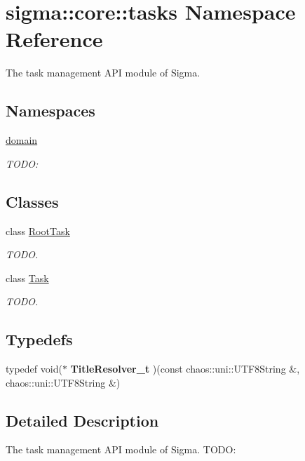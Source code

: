 \hypertarget{namespacesigma_1_1core_1_1tasks}{\section{sigma\-:\-:core\-:\-:tasks Namespace Reference}
\label{namespacesigma_1_1core_1_1tasks}
}


The task management A\-P\-I module of Sigma.  


\subsection*{Namespaces}
\begin{DoxyCompactItemize}
\item 
\hyperlink{namespacesigma_1_1core_1_1tasks_1_1domain}{domain}
\begin{DoxyCompactList}\small\item\em T\-O\-D\-O\-: \end{DoxyCompactList}\end{DoxyCompactItemize}
\subsection*{Classes}
\begin{DoxyCompactItemize}
\item 
class \hyperlink{classsigma_1_1core_1_1tasks_1_1_root_task}{Root\-Task}
\begin{DoxyCompactList}\small\item\em T\-O\-D\-O. \end{DoxyCompactList}\item 
class \hyperlink{classsigma_1_1core_1_1tasks_1_1_task}{Task}
\begin{DoxyCompactList}\small\item\em T\-O\-D\-O. \end{DoxyCompactList}\end{DoxyCompactItemize}
\subsection*{Typedefs}
\begin{DoxyCompactItemize}
\item 
\hypertarget{namespacesigma_1_1core_1_1tasks_a71f1c71a21035c22d06b338ab5aa3368}{typedef void($\ast$ {\bfseries Title\-Resolver\-\_\-t} )(const chaos\-::uni\-::\-U\-T\-F8\-String \&, chaos\-::uni\-::\-U\-T\-F8\-String \&)}\label{namespacesigma_1_1core_1_1tasks_a71f1c71a21035c22d06b338ab5aa3368}

\end{DoxyCompactItemize}


\subsection{Detailed Description}
The task management A\-P\-I module of Sigma. T\-O\-D\-O\-: 
